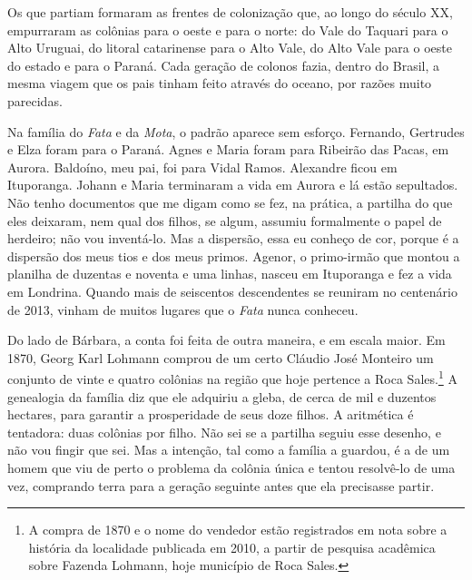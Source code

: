 \documentclass[
  brazilian,
  11pt,
  openany]{book}
\begin{document}
Os que partiam formaram as frentes de colonização que, ao longo do
século XX, empurraram as colônias para o oeste e para o norte: do Vale
do Taquari para o Alto Uruguai, do litoral catarinense para o Alto Vale,
do Alto Vale para o oeste do estado e para o Paraná. Cada geração de
colonos fazia, dentro do Brasil, a mesma viagem que os pais tinham feito
através do oceano, por razões muito parecidas.

Na família do \emph{Fata} e da \emph{Mota}, o padrão aparece sem
esforço. Fernando, Gertrudes e Elza foram para o Paraná. Agnes e Maria
foram para Ribeirão das Pacas, em Aurora. Baldoíno, meu pai, foi para
Vidal Ramos. Alexandre ficou em Ituporanga. Johann e Maria terminaram a
vida em Aurora e lá estão sepultados. Não tenho documentos que me digam
como se fez, na prática, a partilha do que eles deixaram, nem qual dos
filhos, se algum, assumiu formalmente o papel de herdeiro; não vou
inventá-lo. Mas a dispersão, essa eu conheço de cor, porque é a
dispersão dos meus tios e dos meus primos. Agenor, o primo-irmão que
montou a planilha de duzentas e noventa e uma linhas, nasceu em
Ituporanga e fez a vida em Londrina. Quando mais de seiscentos
descendentes se reuniram no centenário de 2013, vinham de muitos lugares
que o \emph{Fata} nunca conheceu.

Do lado de Bárbara, a conta foi feita de outra maneira, e em escala
maior. Em 1870, Georg Karl Lohmann comprou de um certo Cláudio José
Monteiro um conjunto de vinte e quatro colônias na região que hoje
pertence a Roca Sales.\footnote{A compra de 1870 e o nome do vendedor
  estão registrados em nota sobre a história da localidade publicada em
  2010, a partir de pesquisa acadêmica sobre Fazenda Lohmann, hoje
  município de Roca Sales.} A genealogia da família diz que ele adquiriu
a gleba, de cerca de mil e duzentos hectares, para garantir a
prosperidade de seus doze filhos. A aritmética é tentadora: duas
colônias por filho. Não sei se a partilha seguiu esse desenho, e não vou
fingir que sei. Mas a intenção, tal como a família a guardou, é a de um
homem que viu de perto o problema da colônia única e tentou resolvê-lo
de uma vez, comprando terra para a geração seguinte antes que ela
precisasse partir.
\end{document}
